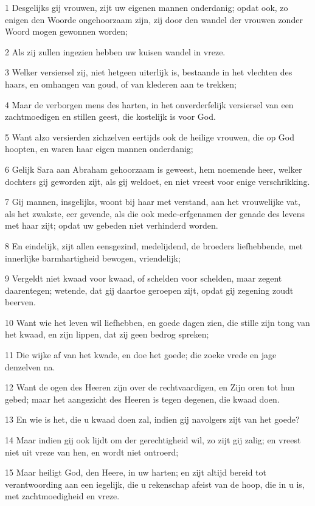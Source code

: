 \par 1 Desgelijks gij vrouwen, zijt uw eigenen mannen onderdanig; opdat ook, zo enigen den Woorde ongehoorzaam zijn, zij door den wandel der vrouwen zonder Woord mogen gewonnen worden;
\par 2 Als zij zullen ingezien hebben uw kuisen wandel in vreze.
\par 3 Welker versiersel zij, niet hetgeen uiterlijk is, bestaande in het vlechten des haars, en omhangen van goud, of van klederen aan te trekken;
\par 4 Maar de verborgen mens des harten, in het onverderfelijk versiersel van een zachtmoedigen en stillen geest, die kostelijk is voor God.
\par 5 Want alzo versierden zichzelven eertijds ook de heilige vrouwen, die op God hoopten, en waren haar eigen mannen onderdanig;
\par 6 Gelijk Sara aan Abraham gehoorzaam is geweest, hem noemende heer, welker dochters gij geworden zijt, als gij weldoet, en niet vreest voor enige verschrikking.
\par 7 Gij mannen, insgelijks, woont bij haar met verstand, aan het vrouwelijke vat, als het zwakste, eer gevende, als die ook mede-erfgenamen der genade des levens met haar zijt; opdat uw gebeden niet verhinderd worden.
\par 8 En eindelijk, zijt allen eensgezind, medelijdend, de broeders liefhebbende, met innerlijke barmhartigheid bewogen, vriendelijk;
\par 9 Vergeldt niet kwaad voor kwaad, of schelden voor schelden, maar zegent daarentegen; wetende, dat gij daartoe geroepen zijt, opdat gij zegening zoudt beerven.
\par 10 Want wie het leven wil liefhebben, en goede dagen zien, die stille zijn tong van het kwaad, en zijn lippen, dat zij geen bedrog spreken;
\par 11 Die wijke af van het kwade, en doe het goede; die zoeke vrede en jage denzelven na.
\par 12 Want de ogen des Heeren zijn over de rechtvaardigen, en Zijn oren tot hun gebed; maar het aangezicht des Heeren is tegen degenen, die kwaad doen.
\par 13 En wie is het, die u kwaad doen zal, indien gij navolgers zijt van het goede?
\par 14 Maar indien gij ook lijdt om der gerechtigheid wil, zo zijt gij zalig; en vreest niet uit vreze van hen, en wordt niet ontroerd;
\par 15 Maar heiligt God, den Heere, in uw harten; en zijt altijd bereid tot verantwoording aan een iegelijk, die u rekenschap afeist van de hoop, die in u is, met zachtmoedigheid en vreze.

